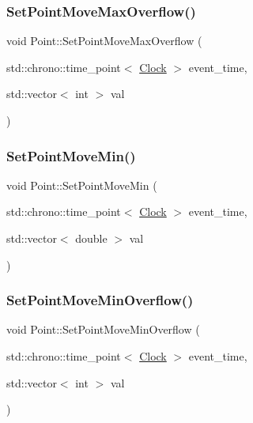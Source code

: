 \mbox{\label{classPoint_a7c9776ffca2fde856fa8eaee669d9881}} 
\subsubsection{\texorpdfstring{Set\+Point\+Move\+Max\+Overflow()}{SetPointMoveMaxOverflow()}}
{\footnotesize\ttfamily void Point\+::\+Set\+Point\+Move\+Max\+Overflow (\begin{DoxyParamCaption}\item[{std\+::chrono\+::time\+\_\+point$<$ \mbox{\hyperlink{universe_8h_a0ef8d951d1ca5ab3cfaf7ab4c7a6fd80}{Clock}} $>$}]{event\+\_\+time,  }\item[{std\+::vector$<$ int $>$}]{val }\end{DoxyParamCaption})\hspace{0.3cm}{\ttfamily [inline]}}

\mbox{\label{classPoint_a287698b6f3ec6a610447fded5c3542ca}} 
\subsubsection{\texorpdfstring{Set\+Point\+Move\+Min()}{SetPointMoveMin()}}
{\footnotesize\ttfamily void Point\+::\+Set\+Point\+Move\+Min (\begin{DoxyParamCaption}\item[{std\+::chrono\+::time\+\_\+point$<$ \mbox{\hyperlink{universe_8h_a0ef8d951d1ca5ab3cfaf7ab4c7a6fd80}{Clock}} $>$}]{event\+\_\+time,  }\item[{std\+::vector$<$ double $>$}]{val }\end{DoxyParamCaption})\hspace{0.3cm}{\ttfamily [inline]}}

\mbox{\label{classPoint_a4a988ff988a3984545cf0c35e764c404}} 
\subsubsection{\texorpdfstring{Set\+Point\+Move\+Min\+Overflow()}{SetPointMoveMinOverflow()}}
{\footnotesize\ttfamily void Point\+::\+Set\+Point\+Move\+Min\+Overflow (\begin{DoxyParamCaption}\item[{std\+::chrono\+::time\+\_\+point$<$ \mbox{\hyperlink{universe_8h_a0ef8d951d1ca5ab3cfaf7ab4c7a6fd80}{Clock}} $>$}]{event\+\_\+time,  }\item[{std\+::vector$<$ int $>$}]{val }\end{DoxyParamCaption})\hspace{0.3cm}{\ttfamily [inline]}}

